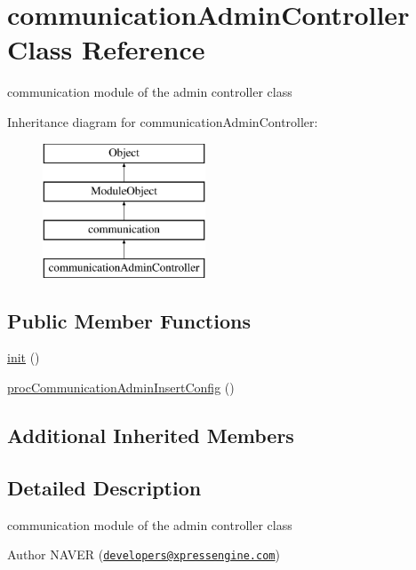 \hypertarget{classcommunicationAdminController}{}\section{communication\+Admin\+Controller Class Reference}
\label{classcommunicationAdminController}


communication module of the admin controller class  


Inheritance diagram for communication\+Admin\+Controller\+:\begin{figure}[H]
\begin{center}
\leavevmode
\includegraphics[height=4.000000cm]{classcommunicationAdminController}
\end{center}
\end{figure}
\subsection*{Public Member Functions}
\begin{DoxyCompactItemize}
\item 
\hyperlink{classcommunicationAdminController_a6ad0b759ad3a139a7cf0784f62297bfb}{init} ()
\item 
\hyperlink{classcommunicationAdminController_a23dbacf4acc643cea069d1de93b406c9}{proc\+Communication\+Admin\+Insert\+Config} ()
\end{DoxyCompactItemize}
\subsection*{Additional Inherited Members}


\subsection{Detailed Description}
communication module of the admin controller class 

\begin{DoxyAuthor}{Author}
N\+A\+V\+ER (\href{mailto:developers@xpressengine.com}{\tt developers@xpressengine.\+com}) 
\end{DoxyAuthor}



